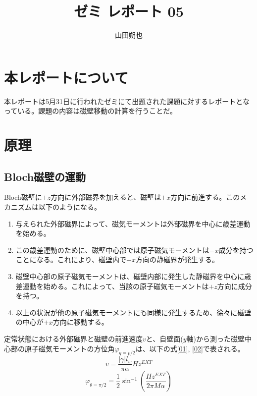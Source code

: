 \documentclass{jsarticle}
\begin{document}
\title{ゼミ レポート 05}
\author{山田朔也}
\maketitle

\section{本レポートについて}
本レポートは5月31日に行われたゼミにて出題された課題に対するレポートとなっている。課題の内容は磁壁移動の計算を行うことだ。

\section{原理}
\subsection{Bloch磁壁の運動}
Bloch磁壁に$+z$方向に外部磁界を加えると、磁壁は$+x$方向に前進する。このメカニズムは以下のようになる。
\begin{enumerate}
  \item 与えられた外部磁界によって、磁気モーメントは外部磁界を中心に歳差運動を始める。
  \item この歳差運動のために、磁壁中心部では原子磁気モーメントは$-x$成分を持つことになる。これにより、磁壁内で$+x$方向の静磁界が発生する。
  \item 磁壁中心部の原子磁気モーメントは、磁壁内部に発生した静磁界を中心に歳差運動を始める。これによって、当該の原子磁気モーメントは$+z$方向に成分を持つ。
  \item 以上の状況が他の原子磁気モーメントにも同様に発生するため、徐々に磁壁の中心が$+x$方向に移動する。
\end{enumerate}

定常状態における外部磁界と磁壁の前進速度$v$と、自壁面($y$軸)から測った磁壁中心部の原子磁気モーメントの方位角$\varphi_{q=p/2}$は、以下の式\ref{01}, \ref{02}で表される。
\begin{equation}
	v = \frac{\lvert\gamma\rvert l_w}{\pi\alpha}Hz^{EXT}
	\label{01}
\end{equation}
\begin{equation}
	\varphi_{\theta=\pi/2} = \frac{1}{2}\sin^{-1}(\frac{Hz^{EXT}}{2\pi M\alpha})
	\label{02}
\end{equation}
\end{document}
